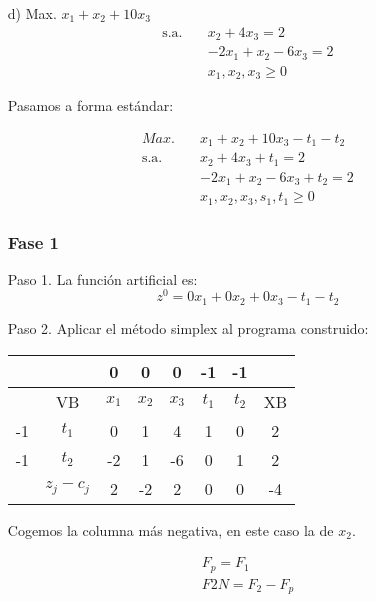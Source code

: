 \begin{itemize}
    
    \item[d)] Max. $x_1 + x_2 + 10x_3$
    \begin{align*}
        \text{s.a.} \quad & x_2 + 4x_3 = 2 \\
        & -2x_1 + x_2 - 6x_3 = 2 \\
        & x_1, x_2, x_3 \geq 0
    \end{align*}

    Pasamos a forma estándar:

    \begin{align*}
        Max. \quad & x_1 + x_2 + 10x_3 - t_1 -t_2\\
        \text{s.a.} \quad & x_2 + 4x_3 + t_1= 2 \\
        & -2x_1 + x_2 - 6x_3 + t_2 = 2 \\
        & x_1, x_2, x_3, s_1, t_1 \geq 0
    \end{align*}

    \subsubsection*{Fase 1}

    Paso 1. La función artificial es: 
    \begin{equation*}
        z^0=0x_1 + 0x_2 + 0x_3  -t_1 -t_2
    \end{equation*}

    Paso 2. Aplicar el método simplex al programa construido:

    \begin{table}[H]
        \centering
        \begin{tabular}{|c|c|c|c|c|c|c|c|}
        \hline
        &  & 0 & 0 & 0 & -1 & -1 &\\
        \hline
        & VB & $x_1$ & $x_2$ & $x_3$ & $t_1$ & $t_2$ & XB \\
        \hline
        -1 & $t_1$ & 0 & 1 & 4 & 1 & 0 & 2\\
        \hline
        -1 & $t_2$ & -2 & 1 & -6 & 0& 1 &2\\
        \hline
        & $z_j - c_j$ & 2 & -2& 2 & 0 & 0 &-4\\
        \hline
        \end{tabular}
    \end{table}

    Cogemos la columna más negativa, en este caso la de $x_2$.

    \begin{align*}
        F_p = F_1\\
        F2N = F_2 - F_p
    \end{align*}


\end{itemize}
